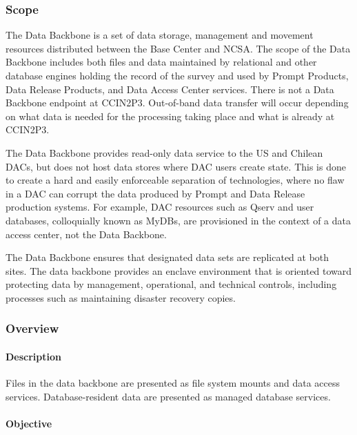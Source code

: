 \subsubsection{Scope}

The Data Backbone is a set of data storage, management and movement
resources distributed between the Base Center and NCSA. The
scope of the Data Backbone includes both files and data maintained by relational
and other database engines holding the record of the survey and used by
Prompt Products, Data Release Products, and Data Access Center services. There is not a
Data Backbone endpoint at CCIN2P3.  Out-of-band data transfer will occur depending on what data is needed for the processing taking place and what is already at CCIN2P3.

The Data Backbone provides read-only data service to the US and Chilean
DACs, but does not host data stores where DAC users create state. This is
done to create a hard and easily enforceable separation of technologies,
where no flaw in a DAC can corrupt the data produced by Prompt and Data Release
production systems. For example, DAC resources such as Qserv and user databases,
colloquially known as MyDBs, are provisioned in the context of a data
access center, not the Data Backbone.

The Data Backbone ensures that designated data sets are replicated at both sites.
The data backbone provides an enclave environment that is oriented toward
protecting data by management, operational, and technical controls,
including processes such as maintaining disaster recovery copies.

\subsubsection{Overview}

\paragraph{Description}

Files in the data backbone are presented as file system mounts and data access
services. Database-resident data are presented as managed database services.

\paragraph{Objective}

